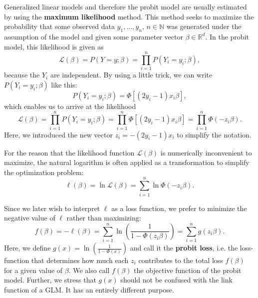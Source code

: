 Generalized linear models and therefore the probit model are usually
estimated by using the \textbf{maximum likelihood} method.
This method seeks to maximize the probability that some observed
data $y_1, ..., y_n$, $n \in \mathbb{N}$ was generated under the
assumption of the model and given some parameter vector
$\beta \in \mathbb{R}^d$.
In the probit model, this likelihood is given as
\begin{equation}
    \mathcal{L}(\beta) = P(Y=y ; \beta) = \prod_{i=1}^n P(Y_i=y_i ; \beta),
\end{equation}
because the $Y_i$ are independent. By using a little trick, we can
write $P(Y_i=y_i;\beta)$ like this:
\begin{equation*}
    P(Y_i = y_i ; \beta) = \Phi[(2y_i - 1) x_i \beta],
\end{equation*}
which enables us to arrive at the likelihood
\begin{equation}
    \mathcal{L}(\beta) = \prod_{i=1}^n P(Y_i=y_i ; \beta)
    = \prod_{i=1}^n \Phi[(2y_i - 1) x_i \beta]
    = \prod_{i=1}^n \Phi(- z_i \beta).
\end{equation}
Here, we introduced the new vector $z_i = - (2y_i - 1) x_i$ to simplify
the notation.

For the reason that the likelihood function $\mathcal{L}(\beta)$ is
numerically inconvenient to maximize, the natural logarithm is often
applied as a transformation to simplify the optimization problem:
\begin{equation}
    \ell(\beta) = \ln \mathcal{L}(\beta) = \sum_{i=1}^n \ln \Phi(- z_i \beta).
\end{equation}

Since we later wish to interpret $\ell$ as a loss function, we prefer
to minimize the negative value of $\ell$ rather than maximizing:
\begin{equation}
    f(\beta) = -\ell(\beta)
    = \sum_{i=1}^n \ln \left( \frac{1}{1 - \Phi(z_i \beta)} \right)
    = \sum_{i=1}^n g(z_i \beta).
\end{equation}
Here, we define $g(x) = \ln \left(\frac{1}{1 - \Phi(x)}\right)$
and call it the \textbf{probit loss}, i.e. the loss-function that
determines how much each $z_i$ contributes to the total loss $f(\beta)$
for a given value of $\beta$.
We also call $f(\beta)$ the objective function of the probit model.
Further, we stress that $g(x)$ should not be confused
with the link function of a GLM. It has an entirely different purpose.

